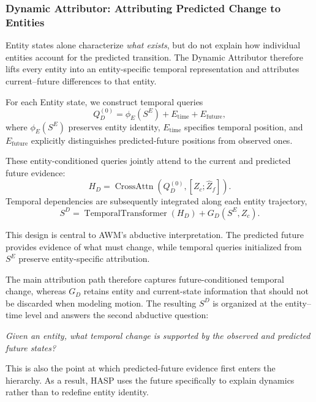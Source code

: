 \documentclass{article}
\begin{document}
\subsubsection{Dynamic Attributor: Attributing Predicted Change to Entities}
Entity states alone characterize \emph{what exists}, but do not explain how individual entities account for the predicted transition. The Dynamic Attributor therefore lifts every entity into an entity-specific temporal representation and attributes current--future differences to that entity.

For each Entity state, we construct temporal queries
\begin{equation}
    Q_D^{(0)}
    =
    \phi_E(S^E)
    + E_{\mathrm{time}}
    + E_{\mathrm{future}},
    \label{eq:dynamic-query-main}
\end{equation}
where $\phi_E(S^E)$ preserves entity identity, $E_{\mathrm{time}}$ specifies temporal position, and $E_{\mathrm{future}}$ explicitly distinguishes predicted-future positions from observed ones.

These entity-conditioned queries jointly attend to the current and predicted future evidence:
\begin{equation}
    H_D
    =
    \operatorname{CrossAttn}
    \left(
    Q_D^{(0)},
    [Z_c;\widehat{Z}_f]
    \right).
    \label{eq:dynamic-attn-main}
\end{equation}
Temporal dependencies are subsequently integrated along each entity trajectory,
\begin{equation}
    S^D
    =
    \operatorname{TemporalTransformer}(H_D)
    + G_D(S^E,Z_c).
    \label{eq:dynamic-main}
\end{equation}

This design is central to AWM's abductive interpretation. The predicted future provides evidence of what must change, while temporal queries initialized from $S^E$ preserve entity-specific attribution.

The main attribution path therefore captures future-conditioned temporal change, whereas $G_D$ retains entity and current-state information that should not be discarded when modeling motion. The resulting $S^D$ is organized at the entity--time level and answers the second abductive question:
\begin{center}
    \emph{Given an entity, what temporal change is supported by the observed and predicted future states?}
\end{center}
This is also the point at which predicted-future evidence first enters the hierarchy. As a result, HASP uses the future specifically to explain dynamics rather than to redefine entity identity.
\end{document}
